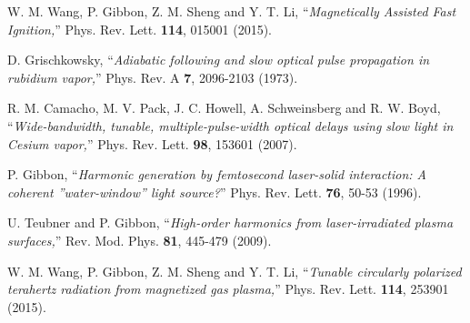 \documentclass[%
aps,
preprint,
showpacs,
preprintnumbers,
 amsmath,
 amssymb,
 prl,
]{revtex4-1}
\begin{document}
\begin{thebibliography}{9}
 W. M. Wang, P. Gibbon, Z. M. Sheng and Y. T. Li, ``\emph{Magnetically Assisted Fast Ignition,}'' Phys. Rev. Lett. \textbf{114}, 015001 (2015).

 D. Grischkowsky, ``\emph{Adiabatic following and slow optical pulse propagation in rubidium vapor,}'' Phys. Rev. A \textbf{7}, 2096-2103 (1973).

 R. M. Camacho, M. V. Pack, J. C. Howell, A. Schweinsberg and R. W. Boyd, ``\emph{Wide-bandwidth, tunable, multiple-pulse-width optical delays using slow light in Cesium vapor,}'' Phys. Rev. Lett. \textbf{98}, 153601 (2007).

 P. Gibbon, ``\emph{Harmonic generation by femtosecond laser-solid interaction: A coherent ''water-window'' light source?}'' Phys. Rev. Lett. \textbf{76}, 50-53 (1996).

 U. Teubner and P. Gibbon, ``\emph{High-order harmonics from laser-irradiated plasma surfaces,}'' Rev. Mod. Phys. \textbf{81}, 445-479 (2009).

 W. M. Wang, P. Gibbon, Z. M. Sheng and Y. T. Li, ``\emph{Tunable circularly polarized terahertz radiation from magnetized gas plasma,}'' Phys. Rev. Lett. \textbf{114}, 253901 (2015).

\end{thebibliography}
\end{document}

